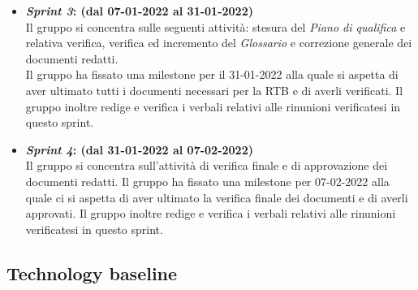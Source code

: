 \begin{itemize}
    \item \textbf{\textit{Sprint 3}: (dal 07-01-2022 al 31-01-2022)}\\
    Il gruppo si concentra sulle seguenti attività: stesura del \textit{Piano di qualifica} e relativa verifica, verifica ed incremento del \textit{Glossario} e correzione generale dei documenti redatti.\\
    Il gruppo ha fissato una milestone per il 31-01-2022 alla quale si aspetta di aver ultimato tutti i documenti necessari per la RTB e di averli verificati.
    Il gruppo inoltre redige e verifica i verbali relativi alle rinunioni verificatesi in questo sprint.

    \item \textbf{\textit{Sprint 4}: (dal 31-01-2022 al 07-02-2022)}\\
    Il gruppo si concentra sull'attività di verifica finale e di approvazione dei documenti redatti. 
    Il gruppo ha fissato una milestone per 07-02-2022 alla quale ci si aspetta di aver ultimato la verifica finale dei documenti e di averli approvati.
    Il gruppo inoltre redige e verifica i verbali relativi alle rinunioni verificatesi in questo sprint.
\end{itemize}

\subsection{Technology baseline}
